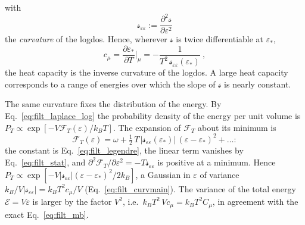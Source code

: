 \documentclass[10pt,a4paper]{article}
\theoremstyle{plain}
\newcommand{\lndos}{{logdos}}  %
\newcommand{\enrg}{\mathcal{E}}  %
\newcommand{\Fen}[1][T]{\mathscr{F}_{#1}}  %
\newcommand{\lds}{\mathscr{s}}  %
\begin{document}
with
\begin{equation}\label{eq:filt_curvdef}
  \lds_{\varepsilon\varepsilon}:=\frac{\partial^{2}\lds}{\partial\varepsilon^{2}}
\end{equation}
the \emph{curvature} of the \lndos. Hence, wherever $\lds$ is twice
differentiable at $\varepsilon_*$,
\begin{equation}\label{eq:filt_curvmain}
  c_\mu=\frac{\partial\varepsilon_*}{\partial T}\bigg|_{\mu}
  =-\frac{1}{T^{2}\,\lds_{\varepsilon\varepsilon}(\varepsilon_*)} ~,
\end{equation}
the heat capacity is the inverse curvature of the \lndos. A large heat
capacity corresponds to a range of energies over which the slope of $\lds$
is nearly constant.

The same curvature fixes the distribution of the energy. By
Eq.~\eqref{eq:filt_laplace_log} the probability density of the energy per
unit volume is $P_T\propto\exp[-V\Fen(\varepsilon)/k_BT]$. The expansion of
$\Fen$ about its minimum is
\begin{equation}\label{eq:filt_gauss}
  \Fen(\varepsilon)=\omega
  +\tfrac12\,T\,|\lds_{\varepsilon\varepsilon}(\varepsilon_*)|\,(\varepsilon-\varepsilon_*)^{2}
  +\dots :
\end{equation}
the constant is Eq.~\eqref{eq:filt_legendre}, the linear term vanishes by
Eq.~\eqref{eq:filt_stat}, and
$\partial^{2}\Fen/\partial\varepsilon^{2}=-T\lds_{\varepsilon\varepsilon}$ is
positive at a minimum. Hence
$P_T\propto\exp[-V|\lds_{\varepsilon\varepsilon}|(\varepsilon-\varepsilon_*)^{2}/2k_B]$,
a Gaussian in $\varepsilon$ of variance
$k_B/V|\lds_{\varepsilon\varepsilon}|=k_BT^{2}c_\mu/V$
(Eq.~\eqref{eq:filt_curvmain}). The variance of the total energy
$\enrg=V\varepsilon$ is larger by the factor $V^{2}$, i.e.\
$k_BT^{2}\,Vc_\mu=k_BT^{2}C_\mu$, in agreement with the exact
Eq.~\eqref{eq:filt_mb}.
\end{document}
